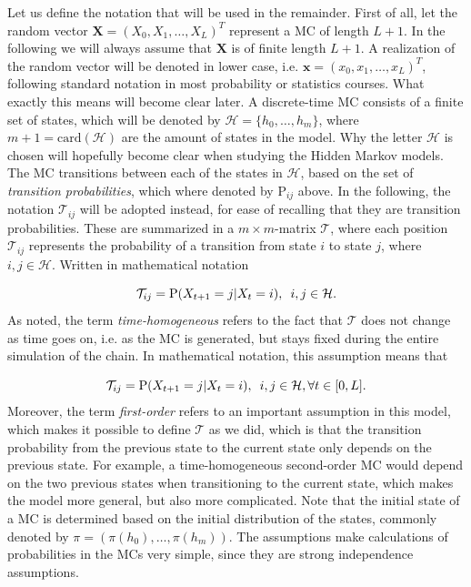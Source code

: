 \documentclass{article}\usepackage[]{graphicx}\usepackage[]{color}
\begin{document}
Let us define the notation that will be used in the remainder. First of all, let the random vector $\mathbf{X} = (X_0, X_1, \ldots, X_L)^T$ represent a MC of length $L+1$. In the following we will always assume that $\mathbf{X}$ is of finite length $L+1$. A realization of the random vector will be denoted in lower case, i.e. $\mathbf{x} = (x_0, x_1, \ldots, x_L)^T$, following standard notation in most probability or statistics courses. What exactly this means will become clear later. A discrete-time MC consists of a finite set of states, which will be denoted by $\mathcal{H} = \{h_0, \ldots, h_m\}$, where $m+1 = \text{card}(\mathcal{H})$ are the amount of states in the model. Why the letter $\mathcal{H}$ is chosen will hopefully become clear when studying the Hidden Markov models. The MC transitions between each of the states in $\mathcal{H}$, based on the set of \textit{transition probabilities}, which where denoted by $\text{P}_{ij}$ above. In the following, the notation $\mathcal{T}_{ij}$ will be adopted instead, for ease of recalling that they are transition probabilities. These are summarized in a $m \times m$-matrix $\mathcal{T}$, where each position $\mathcal{T}_{ij}$ represents the probability of a transition from state $i$ to state $j$, where $i, j \in \mathcal{H}$. Written in mathematical notation

\begin{equation*}
        \mathcal{T}_{ij} = \text{P}(X_{t+1} = j|X_{t} = i), \hspace{0.5em} i,j \in \mathcal{H}. 
\end{equation*}
As noted, the term \textit{time-homogeneous} refers to the fact that $\mathcal{T}$ does not change as time goes on, i.e. as the MC is generated, but stays fixed during the entire simulation of the chain. In mathematical notation, this assumption means that

\begin{equation*}
    \mathcal{T}_{ij} = \text{P}(X_{t+1} = j|X_{t} = i), \hspace{0.5em} i,j \in \mathcal{H}, \forall t \in [0,L].
\end{equation*}
Moreover, the term \textit{first-order} refers to an important assumption in this model, which makes it possible to define $\mathcal{T}$ as we did, which is that the transition probability from the previous state to the current state only depends on the previous state. For example, a time-homogeneous second-order MC would depend on the two previous states when transitioning to the current state, which makes the model more general, but also more complicated. Note that the initial state of a MC is determined based on the initial distribution of the states, commonly denoted by $\pi = (\pi(h_0), \ldots, \pi(h_m))$. The assumptions make calculations of probabilities in the MCs very simple, since they are strong independence assumptions. 
\end{document}

